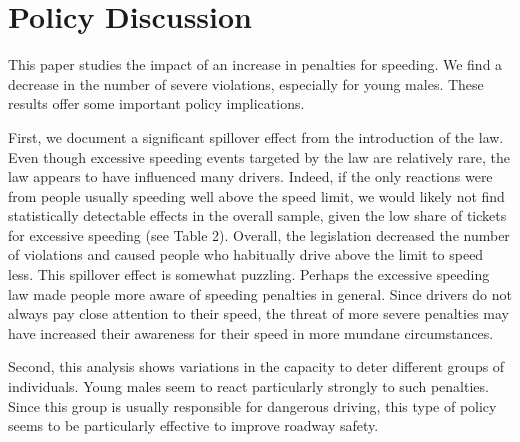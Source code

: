 \section{Policy Discussion}
\label{sec:Discussion}


This paper studies the impact of an increase in penalties for speeding. We find a decrease in the number of severe violations, especially for young males. These results offer some important policy implications.

First, we document a significant spillover effect from the introduction of the law. Even though excessive speeding events targeted by the law are relatively rare, the law appears to have influenced many drivers. Indeed, if the only reactions were from people usually speeding well above the speed limit, we would likely not find statistically detectable effects in the overall sample, given the low share of tickets for excessive speeding (see Table 2). Overall, the legislation decreased the number of violations and caused people who habitually drive above the limit to speed less. This spillover effect is somewhat puzzling. Perhaps the excessive speeding law made people more aware of speeding penalties in general. Since drivers do not always pay close attention to their speed, the threat of more severe penalties may have increased their awareness for their speed in more mundane circumstances.

Second, this analysis shows variations in the capacity to deter different groups of individuals. Young males seem to react particularly strongly to such penalties. Since this group is usually responsible for dangerous driving, this type of policy seems to be particularly effective to improve roadway safety.
